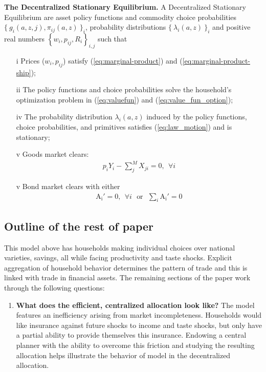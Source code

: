 \documentclass[12pt,pdftex]{article}
\begin{document}
\begin{onehalfspacing}
\textbf{The Decentralized Stationary Equilibrium.} A Decentralized Stationary Equilibrium are asset policy functions and commodity choice probabilities $\{\  g_{i}(a, z, j), \pi_{ij}(a, z) \ \}_{i}$, probability distributions $\{ \ \lambda_i(a, z) \ \}_{i}$ and positive real numbers $\left \{w_i, p_{ij}, R_i\right \}_{i,j}$ such that
\begin{itemize}
\vspace{-.4cm}
\item[i]  Prices ($w_i, p_{ij}$) satisfy (\ref{eq:marginal-product}) and (\ref{eq:marginal-product-ship});
\item[ii] The policy functions and choice probabilities solve the household's optimization problem in (\ref{eq:valuefun}) and (\ref{eq:value_fun_option});
\item[iv] The probability distribution $\lambda_i(a, z)$ induced by the policy functions, choice probabilities, and primitives satisfies (\ref{eq:law_motion}) and is stationary;
\item[v] Goods market clears:
\begin{align}
p_{i} Y_{i} - \sum_{j}^{M}  X_{ji} = 0, \ \ \forall i
\end{align}
\item[v] Bond market clears with either
\begin{align}
\mathrm{A_i'} = 0, \ \ \forall i \ \ \ \mbox{or} \ \ \ \sum_{i}\mathrm{A_i'} = 0
\label{eq:fa-condition}
\end{align}
\end{itemize}

\subsection{Outline of the rest of paper}

This model above has households making individual choices over national varieties, savings, all while facing productivity and taste shocks. Explicit aggregation of household behavior determines the pattern of trade and this is linked with trade in financial assets.  The remaining sections of the paper work through the following questions:
\begin{enumerate}
\item \textbf{What does the efficient, centralized allocation look like?} The model features an inefficiency arising from market incompleteness. Households would like insurance against future shocks to income and taste shocks, but only have a partial ability to provide themselves this insurance. Endowing a central planner with the ability to overcome this friction and studying the resulting allocation helps illustrate the behavior of model in the decentralized allocation.


\end{enumerate}
\end{onehalfspacing}
\end{document}
